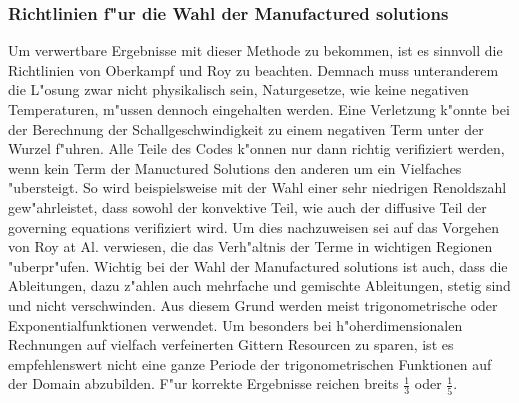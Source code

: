 \subsubsection{Richtlinien f"ur die Wahl der Manufactured solutions}
Um verwertbare Ergebnisse mit dieser Methode zu bekommen, ist es sinnvoll die Richtlinien von Oberkampf und Roy \cite{bookMMS} zu beachten. Demnach muss unteranderem die L"osung zwar nicht physikalisch sein, Naturgesetze, wie keine negativen Temperaturen, m"ussen dennoch eingehalten werden. Eine Verletzung k"onnte bei der Berechnung der Schallgeschwindigkeit zu einem negativen Term unter der Wurzel f"uhren.
Alle Teile des Codes k"onnen nur dann richtig verifiziert werden, wenn kein Term der Manuctured Solutions den anderen um ein Vielfaches "ubersteigt. So wird beispielsweise mit der Wahl einer sehr niedrigen Renoldszahl gew"ahrleistet, dass sowohl der konvektive Teil, wie auch der diffusive Teil der governing equations verifiziert wird. Um dies nachzuweisen sei auf das Vorgehen von Roy at Al. \cite{roy2007verification} verwiesen, die das Verh"altnis der Terme in wichtigen Regionen "uberpr"ufen.
Wichtig bei der Wahl der Manufactured solutions ist auch, dass die Ableitungen, dazu z"ahlen auch mehrfache und gemischte Ableitungen, stetig sind und nicht verschwinden. Aus diesem Grund werden meist trigonometrische oder Exponentialfunktionen verwendet.
Um besonders bei h"oherdimensionalen Rechnungen auf vielfach verfeinerten Gittern Resourcen zu sparen, ist es empfehlenswert nicht eine ganze Periode der trigonometrischen Funktionen auf der Domain abzubilden. F"ur korrekte Ergebnisse reichen breits $\frac{1}{3}$ oder $\frac{1}{5}$.
